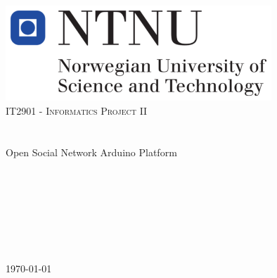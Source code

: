 \begin{titlepage}
	\begin{center}
		\includegraphics[width=0.75\textwidth]{img/NTNU-logo.png}\\[1cm]    
		\textsc{\Large IT2901 - Informatics Project II}\\[0.5cm]
		\HRule \\[0.6cm]
		{ \huge \bfseries \project}\\[0.4cm]
		Open Social Network Arduino Platform
		\HRule \\[1.5cm]
		\begin{center} \large
			\anders \\
			\henrik \\
			\johan \\
			\asbjorn \\
			\emanuele \\
			\jonas \\
			\bjornar
		\end{center}
		\vfill
		{\large \today}
	\end{center}
\end{titlepage}
